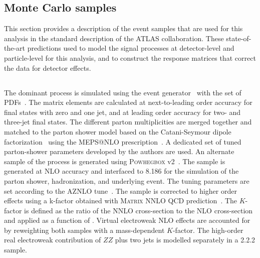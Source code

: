 \subsection{Monte Carlo samples}
\label{sec:montecarlopred}
This section provides a description of the event samples that are used for this analysis in the standard description of the ATLAS collaboration. These state-of-the-art predictions used to model the signal processes at detector-level and particle-level for this analysis, and to construct the response matrices that correct the data for detector effects. 
\subsection{\qqFourL}
The dominant \qqFourL process is simulated using the  event generator~\cite{Bothmann:2019yzt} with the \nnpdfnnlo{} set of PDFs~\cite{Ball:2014uwa}. The matrix elements are calculated at next-to-leading order accuracy for final states with zero and one jet, and at leading order accuracy for two- and three-jet final states. The different parton multiplicities are merged together and matched to the \SHERPA parton shower model based on the Catani-Seymour dipole factorization~\cite{Gleisberg:2008fv,Schumann:2007mg} using the MEPS@NLO prescription~\cite{Hoeche:2011fd,Catani:2001cc,Hoeche:2009r}. A dedicated set of tuned parton-shower parameters developed by the \SHERPA authors are used. 
An alternate sample of the \qqFourL process is generated using  \textsc{Powhegbox} v2~\cite{Alioli:2010xd,Melia:2011tj,Nason:2013ydw}. The sample is generated at NLO accuracy and interfaced to \pythia{} 8.186 for the simulation of the parton shower, hadronization, and underlying event. The tuning parameters are set according to the AZNLO tune~\cite{STDM-2012-23}. The sample is corrected to higher order effects using a k-factor obtained with \textsc{Matrix} NNLO QCD prediction~\cite{Cascioli:2014yka,Grazzini:2015hta,Grazzini:2017mhc,Kallweit:2018nyv}. The $K$-factor is defined as the ratio of the NNLO cross-section to the NLO cross-section and applied as a function of \mFourL{}. 
Virtual electroweak NLO effects are accounted for by reweighting both samples with a mass-dependent $K$-factor. The high-order real electroweak contribution of $ZZ$ plus two jets is modelled separately in a \SHERPA{} {2.2.2} sample. 

